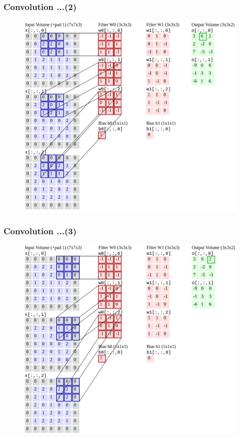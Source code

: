 \documentclass{beamer}
\begin{document}
\begin{frame}
	\frametitle{Convolution ...(2)}
	\begin{figure}
		\includegraphics[scale=0.28]{./figures/edit/conv_04_edit.png}
	\end{figure}
\end{frame}

\begin{frame}
	\frametitle{Convolution ...(3)}
	\begin{figure}	
		\includegraphics[scale=0.28]{./figures/edit/conv_05_edit.png}
	\end{figure}
\end{frame}
\end{document}
